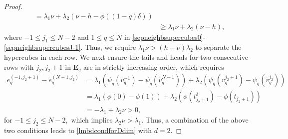 \documentclass[10pt,reqno,final]{amsart}
\theoremstyle{remark}
\theoremstyle{definition}
\newcommand{\bs}[1]{\boldsymbol{#1}}
\begin{document}
\begin{proof}
\begin{equation}
\begin{split}
=\lambda_1\nu + \lambda_2 (\nu-h-\phi((1-q)\delta))\\
& \ge \lambda_1\nu +\lambda_2 (\nu-h),
\end{split}
\end{equation}
where $-1\le j_1\le N-2$ and $1\le q\le N$ in   
\eqref{sepneighbsupercubes0}-\eqref{sepneighbsupercubesJ-1}. Thus,  we require
$
{\lambda_1}\nu > (h-\nu)\lambda_2$ to separate the hypercubes in each row.  We next ensure the tails  and heads for two consecutive rows
with $j_2, j_2+1$ in $\bs E_q$ are in strictly increasing order, which requires
\begin{equation}\label{sepneighbrow}
\begin{split}
 e_q^{(-1,j_2+1)} -\tilde e_q^{(N-1,j_2)}&=\lambda_1(\psi_q( v_q^{-1})-\psi_q(\tilde v_q^{N-1}))
+\lambda_2(\psi_q( v_q^{j_2+1})-\psi_q(\tilde v_q^{j_2}))\\&
=\lambda_1(\phi(0)-\phi(1))
+\lambda_2(\phi(t_{j_2+1}^{\delta})-\phi(t_{j_2+1}))\\
&=-\lambda_1+\lambda_2\nu> 0, 
\end{split}
\end{equation}
for $-1\leq j_2\leq N-2,$ 
 which implies  ${\lambda_2}\nu>{\lambda_1}.$  Thus, a combination of the above two conditions leads to \eqref{lmbdcondforDdim} with $d=2.$



\end{proof}
\end{document}
